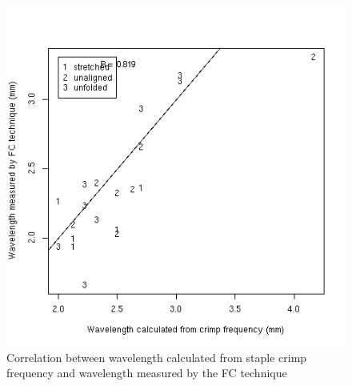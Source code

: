 %

\begin{figure}[!hb]
  \centering
  \includegraphics[width=1.0\textwidth]{figcrimpwavlfc.png}
  \caption{Correlation between wavelength calculated from staple crimp frequency and wavelength measured by the FC technique}
  \label{fig:crimpwavlfc}
\end{figure}

%


